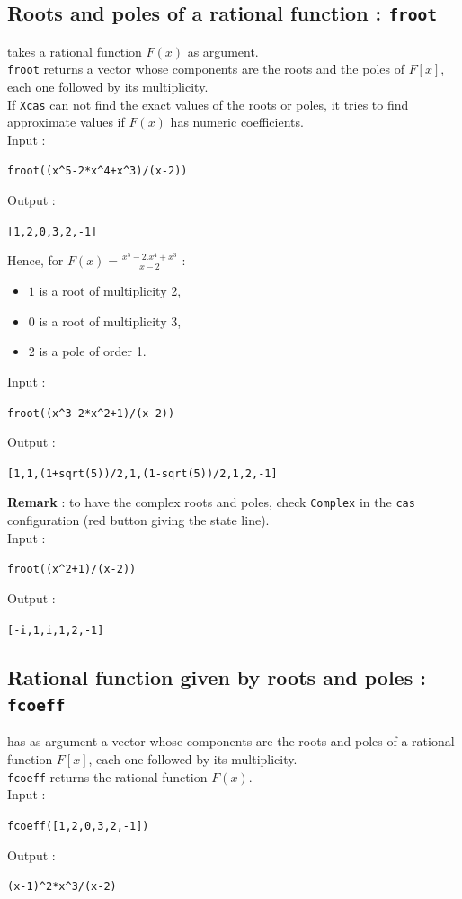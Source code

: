 \documentclass[a4paper,11pt]{book}
\begin{document}
\subsection{Roots and poles of a rational function : {\tt froot}}
 takes a rational function $F(x)$ as argument.\\
{\tt froot} returns a vector whose components are the roots and the poles
of $F[x]$, each one followed by its multiplicity.\\
If {\tt Xcas} can not find the exact values of the roots or poles,
it tries to find approximate values if $F(x)$ has numeric coefficients.\\
Input :
\begin{center}{\tt froot((x\verb|^|5-2*x\verb|^|4+x\verb|^|3)/(x-2)) }\end{center}
Output :
\begin{center}{\tt [1,2,0,3,2,-1]}\end{center}
Hence, for $\displaystyle F(x)=\frac{x^5-2.x^4+x^3}{x-2}$ :
\begin{itemize}
\item $1$ is a root of multiplicity 2,
\item $0$ is a root of multiplicity 3,
\item $2$ is a pole of order 1.
\end{itemize}
Input :
\begin{center}{\tt froot((x\verb|^|3-2*x\verb|^|2+1)/(x-2)) }\end{center}
Output :
\begin{center}{\tt [1,1,(1+sqrt(5))/2,1,(1-sqrt(5))/2,1,2,-1]}\end{center}
{\bf Remark} : to have the complex roots and poles, check {\tt Complex} in
the {\tt cas} configuration (red button giving the state line).\\
Input :
\begin{center}{\tt froot((x\verb|^|2+1)/(x-2)) }\end{center}
Output :
\begin{center}{\tt [-i,1,i,1,2,-1]}\end{center}

\subsection{Rational function given by roots and poles : {\tt fcoeff}}
 has as argument a vector
whose components are the roots and poles of a rational function
$F[x]$, each one followed by its multiplicity.\\
{\tt fcoeff} returns the rational function $F(x)$.\\
Input :
\begin{center}{\tt fcoeff([1,2,0,3,2,-1]) }\end{center}
Output :
\begin{center}{\tt (x-1)\verb|^|2*x\verb|^|3/(x-2)}\end{center}
\end{document}

